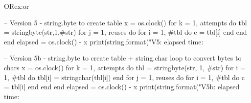 \begin{texexample}{OR}{ex:or}
\begin{luacode}
-- Version 5 - string.byte to create table
x = os.clock()
for k = 1, attempts do
    tbl = {stringbyte(str,1,#str)}
    for j = 1, reuses do
        for i = 1, #tbl do
            c = tbl[i]
        end
    end
end
elapsed = os.clock() - x
print(string.format("V5: elapsed time: %

-- Version 5b - string.byte to create table + string.char loop to convert bytes to chars
x = os.clock()
for k = 1, attempts do
    tbl = {stringbyte(str, 1, #str)}
    for i = 1, #tbl do
        tbl[i] = stringchar(tbl[i])
    end
    for j = 1, reuses do
        for i = 1, #tbl do
            c = tbl[i]
        end
    end
end
elapsed = os.clock() - x
print(string.format("V5b: elapsed time: %
\end{luacode}
\end{texexample}


